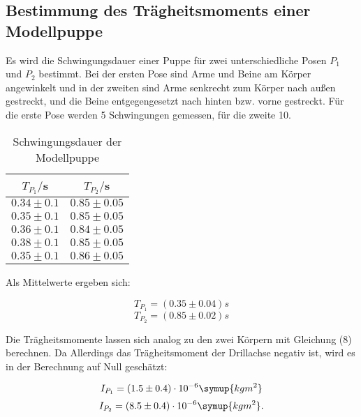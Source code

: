 \subsection{Bestimmung des Trägheitsmoments einer Modellpuppe}
Es wird die Schwingungsdauer einer Puppe für zwei unterschiedliche 
Posen $P_\text{1}$ und $P_\text{2}$ bestimmt. Bei der ersten Pose sind Arme und Beine am Körper angewinkelt und in der zweiten
sind Arme senkrecht zum Körper nach außen gestreckt, und die Beine entgegengesetzt nach hinten bzw. vorne gestreckt.
Für die erste Pose werden 5 Schwingungen gemessen, für die zweite 10.
\begin{table}[H]
  \centering
  \caption{Schwingungsdauer der Modellpuppe}
  \label{tab:Schwingungsdauer der Modellpuppe}
  \begin{tabular}{c c}
    \toprule
    $T_{P_1}/$s & $T_{P_2}/$s \\
    \midrule
    $0.34 \pm 0.1$ & $0.85 \pm 0.05$ \\
    $0.35 \pm 0.1$ & $0.85 \pm 0.05$ \\
    $0.36 \pm 0.1$ & $0.84 \pm 0.05$ \\
    $0.38 \pm 0.1$ & $0.85 \pm 0.05$ \\
    $0.35 \pm 0.1$ & $0.86 \pm 0.05$ \\
    \bottomrule
  \end{tabular}
\end{table}

Als Mittelwerte ergeben sich:

\begin{equation}
T_{P_1} = (0.35 \pm 0.04) s
\end{equation}
\begin{equation}
T_{P_2}= (0.85 \pm 0.02) s
\end{equation}

Die Trägheitsmomente lassen sich analog zu den zwei Körpern mit Gleichung (8) berechnen.
Da Allerdings das Trägheitsmoment der Drillachse negativ ist, wird es in der Berechnung auf Null geschätzt:

\begin{equation}
I_{P_1}  = (1.5 \pm 0.4)\cdot 10^{-6} \symup{kgm^2} 
\end{equation}
\begin{equation}
I_{P_2}  = (8.5 \pm 0.4)\cdot 10^{-6} \symup{kgm^2} .
\end{equation}




